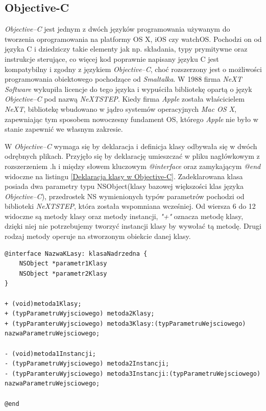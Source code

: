 \documentclass{iiuwb}
\begin{document}
\subsection{Objective-C}
\textit{Objective--C} jest jednym z dwóch języków programowania używanym do tworzenia oprogramowania na platformy OS X, iOS czy watchOS. Pochodzi on od języka C i dziedziczy takie elementy jak np. składania, typy prymitywne oraz instrukcje sterujące, co więcej kod poprawnie napisany języku C jest kompatybilny i zgodny z językiem \textit{Objective--C}, choć rozszerzony jest o możliwości programowania obiektowego pochodzące od \textit{Smaltalka}.
W 1988 firma \textit{NeXT Software} wykupiła licencje do tego języka i wypuściła bibliotekę opartą o język \textit{Objective--C} pod nazwą \textit{NeXTSTEP}. Kiedy firma \textit{Apple} została właścicielem \textit{NeXT}, bibliotekę wbudowano w jądro systemów operacyjnych \textit{Mac OS X}, zapewniając tym sposobem nowoczesny fundament OS, którego \textit{Apple} nie było w stanie zapewnić we własnym zakresie.

W \textit{Objective--C} wymaga się by deklaracja i definicja klasy odbywała się w dwóch odrębnych plikach. Przyjęło się by deklarację umieszczać w pliku nagłówkowym z rozszerzeniem .h i między słowem kluczowym \textit{@interface} oraz zamykającym \textit{@end} widoczne na listingu \ref{Deklaracja klasy w Objective-C}. Zadeklarowana klasa posiada dwa parametry typu NSObject(klasy bazowej większości klas języka \textit{Objective--C}), przedrostek NS wymienionych typów parametrów pochodzi od biblioteki \textit{NeXTSTEP}, która została wspomniana wcześniej. Od wiersza 6 do 12 widoczne są metody klasy oraz metody instancji, \textit{"+"} oznacza metodę klasy, dzięki niej nie potrzebujemy tworzyć instancji klasy by wywołać tą metodę. Drugi rodzaj metody operuje na stworzonym obiekcie danej klasy.
\begin{lstlisting}[label=Deklaracja klasy w Objective-C, caption=Deklaracje klasy umieszczamy w pliku  \textit{.h}]
@interface NazwaKLasy: klasaNadrzedna {
	NSObject *parametr1Klasy
	NSObject *parametr2Klasy
}

+ (void)metoda1Klasy;
+ (typParametruWyjsciowego) metoda2Klasy;
+ (typParamteruWyjsciowego) metoda3Klasy:(typParametruWejsciowego) nazwaParametruWejsciowego;

- (void)metoda1Instancji;
- (typParametruWyjsciowego) metoda2Instancji;
- (typParamteruWyjsciowego) metoda3Instancji:(typParametruWejsciowego) nazwaParametruWejsciowego;

@end
\end{lstlisting}
\end{document}
